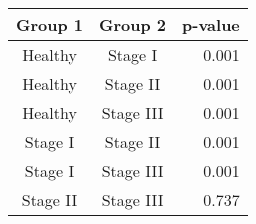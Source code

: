 \begin{tabular}{cc|r}
    \textbf{Group 1} & \textbf{Group 2} & \textbf{p-value} \\
    \hline
    Healthy & Stage I & 0.001 \\
    Healthy & Stage II & 0.001 \\
    Healthy & Stage III & 0.001 \\
    Stage I & Stage II & 0.001 \\
    Stage I & Stage III & 0.001 \\
    Stage II & Stage III & 0.737 \\
\end{tabular}
